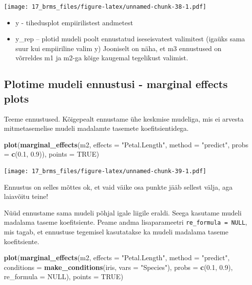 \documentclass[]{book}
\newenvironment{Shaded}{\begin{snugshade}}{\end{snugshade}}
\newcommand{\DataTypeTok}[1]{\textcolor[rgb]{0.13,0.29,0.53}{#1}}
\newcommand{\FloatTok}[1]{\textcolor[rgb]{0.00,0.00,0.81}{#1}}
\newcommand{\KeywordTok}[1]{\textcolor[rgb]{0.13,0.29,0.53}{\textbf{#1}}}
\newcommand{\NormalTok}[1]{#1}
\newcommand{\OtherTok}[1]{\textcolor[rgb]{0.56,0.35,0.01}{#1}}
\newcommand{\StringTok}[1]{\textcolor[rgb]{0.31,0.60,0.02}{#1}}
\providecommand{\tightlist}{%
  \setlength{\itemsep}{0pt}\setlength{\parskip}{0pt}}
\begin{document}
\texttt{[image: 17\_brms\_files/figure-latex/unnamed-chunk-38-1.pdf]}

\begin{itemize}
\tightlist
\item
  y - tihedusplot empiirilistest andmetest
\item
  y\_rep -- plotid mudeli poolt ennustatud iseseisvatest valimitest (igaüks sama suur kui empiiriline valim y)
  Jooniselt on näha, et m3 ennustused on võrreldes m1 ja m2-ga kõige kaugemal tegelikust valimist.
\end{itemize}

\hypertarget{plotime-mudeli-ennustusi---marginal-effects-plots}{%
\subsection{Plotime mudeli ennustusi - marginal effects plots}\label{plotime-mudeli-ennustusi---marginal-effects-plots}}

Teeme ennustused. Kõigepealt ennustame ühe keskmise mudeliga, mis ei arvesta mitmetasemelise mudeli madalamte tasemete koefitsientidega.

\begin{Shaded}
\begin{Highlighting}[]
\KeywordTok{plot}\NormalTok{(}\KeywordTok{marginal_effects}\NormalTok{(m2, }\DataTypeTok{effects =} \StringTok{"Petal.Length"}\NormalTok{, }\DataTypeTok{method =} \StringTok{"predict"}\NormalTok{, }\DataTypeTok{probs =} \KeywordTok{c}\NormalTok{(}\FloatTok{0.1}\NormalTok{, }\FloatTok{0.9}\NormalTok{)), }\DataTypeTok{points =} \OtherTok{TRUE}\NormalTok{)}
\end{Highlighting}
\end{Shaded}

\texttt{[image: 17\_brms\_files/figure-latex/unnamed-chunk-39-1.pdf]}

Ennustus on selles mõttes ok, et vaid väike osa punkte jääb sellest välja, aga laiavõitu teine!

Nüüd ennustame sama mudeli põhjal igale liigile eraldi. Seega kasutame mudeli madalama taseme koefitsiente. Peame andma lisaparameetri \texttt{re\_formula\ =\ NULL}, mis tagab, et ennustuse tegemisel kasutatakse ka mudeli madalama taseme koefitsiente.

\begin{Shaded}
\begin{Highlighting}[]
\KeywordTok{plot}\NormalTok{(}\KeywordTok{marginal_effects}\NormalTok{(m2, }\DataTypeTok{effects =} \StringTok{"Petal.Length"}\NormalTok{, }\DataTypeTok{method =} \StringTok{"predict"}\NormalTok{, }\DataTypeTok{conditions =} \KeywordTok{make_conditions}\NormalTok{(iris, }\DataTypeTok{vars =} \StringTok{"Species"}\NormalTok{), }\DataTypeTok{probs =} \KeywordTok{c}\NormalTok{(}\FloatTok{0.1}\NormalTok{, }\FloatTok{0.9}\NormalTok{), }\DataTypeTok{re_formula =} \OtherTok{NULL}\NormalTok{), }\DataTypeTok{points =} \OtherTok{TRUE}\NormalTok{)}
\end{Highlighting}
\end{Shaded}
\end{document}
